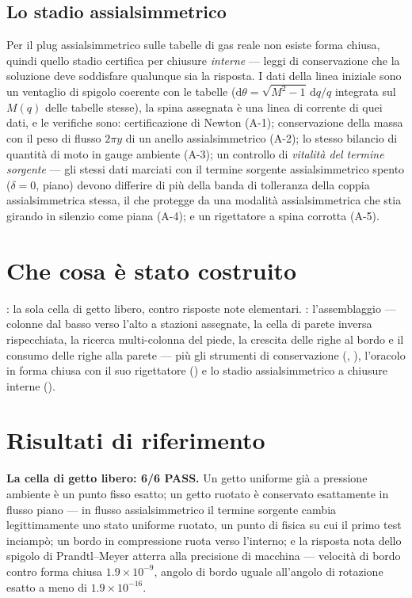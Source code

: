 \subsection{Lo stadio assialsimmetrico}

Per il plug assialsimmetrico sulle tabelle di gas reale non esiste
forma chiusa, quindi quello stadio certifica per chiusure
\emph{interne} --- leggi di conservazione che la soluzione deve
soddisfare qualunque sia la risposta. I dati della linea iniziale
sono un ventaglio di spigolo coerente con le tabelle
($\mathrm{d}\theta = \sqrt{M^2-1}\,\mathrm{d}q/q$ integrata sul
$M(q)$ delle tabelle stesse), la spina assegnata è una linea di
corrente di quei dati, e le verifiche sono: certificazione di Newton
(A-1); conservazione della massa con il peso di flusso $2\pi y$ di
un anello assialsimmetrico (A-2); lo stesso bilancio di quantità di
moto in gauge ambiente (A-3); un controllo di \emph{vitalità del
termine sorgente} --- gli stessi dati marciati con il termine
sorgente assialsimmetrico spento ($\delta = 0$, piano) devono
differire di più della banda di tolleranza della coppia
assialsimmetrica stessa, il che protegge da una modalità
assialsimmetrica che stia girando in silenzio come piana (A-4); e un
rigettatore a spina corrotta (A-5).

\section{Che cosa è stato costruito}

: la sola cella di getto
libero, contro risposte note elementari.
: l'assemblaggio --- colonne
dal basso verso l'alto a stazioni assegnate, la cella di parete
inversa rispecchiata, la ricerca multi-colonna del piede, la
crescita delle righe al bordo e il consumo delle righe alla parete
--- più gli strumenti di conservazione (,
), l'oracolo in forma chiusa con il suo
rigettatore () e lo stadio assialsimmetrico a
chiusure interne ().

\section{Risultati di riferimento}

\textbf{La cella di getto libero: 6/6 PASS.} Un getto uniforme già a
pressione ambiente è un punto fisso esatto; un getto ruotato è
conservato esattamente in flusso piano --- in flusso assialsimmetrico
il termine sorgente cambia legittimamente uno stato uniforme
ruotato, un punto di fisica su cui il primo test inciampò; un bordo
in compressione ruota verso l'interno; e la risposta nota dello
spigolo di Prandtl--Meyer atterra alla precisione di macchina ---
velocità di bordo contro forma chiusa $1.9\times10^{-9}$, angolo di
bordo uguale all'angolo di rotazione esatto a meno di
$1.9\times10^{-16}$.

